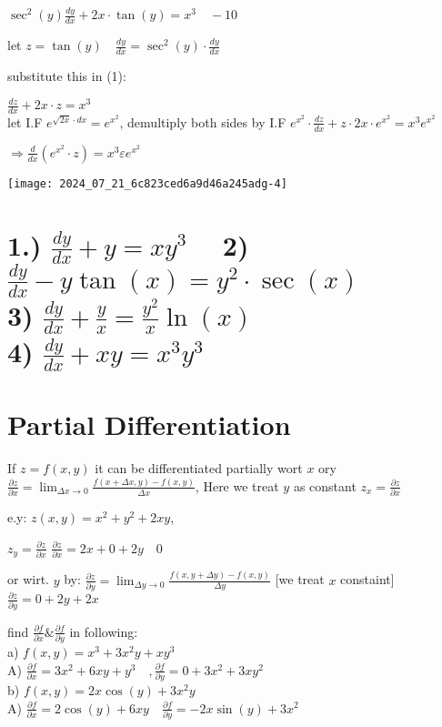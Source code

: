 \documentclass[12pt, a4paper]{article}
\begin{document}
$\sec ^{2}(y) \frac{d y}{d x}+2 x \cdot \tan (y)=x^{3} \quad-10$

let $z=\tan (y) \quad \frac{d y}{d x}=\sec ^{2}(y) \cdot \frac{d y}{d x}$

substitute this in (1):

$\frac{d z}{d x}+2 x \cdot z=x^{3}$\\
let I.F $e^{\sqrt{2 x} \cdot d x}=e^{x^{2}}$, demultiply both sides by I.F $e^{x^{2}} \cdot \frac{d z}{d x}+z \cdot 2 x \cdot e^{x^{2}}=x^{3} e^{x^{2}}$

$\Rightarrow \frac{d}{d x}\left(e^{x^{2}} \cdot z\right)=x^{3} \varepsilon e^{x^{2}}$

\begin{center}
\texttt{[image: 2024\_07\_21\_6c823ced6a9d46a245adg-4]}
\end{center}

\section*{1.) $\frac{d y}{d x}+y=x y^{3} \quad$ 2) $\frac{d y}{d x}-y \tan (x)=y^{2} \cdot \sec (x)$ \\
 3) $\frac{d y}{d x}+\frac{y}{x}=\frac{y^{2}}{x} \ln (x)$ \\
 4) $\frac{d y}{d x}+x y=x^{3} y^{3}$}
\section*{Partial Differentiation}
If $z=f(x, y)$ it can be differentiated partially wort $x$ ory $\frac{\partial z}{\partial x}=\lim _{\Delta x \rightarrow 0} \frac{f(x+\Delta x, y)-f(x, y)}{\Delta x}$, Here we treat $y$ as constant $z_{x}=\frac{\partial z}{\partial x}$

e.y: $z(x, y)=x^{2}+y^{2}+2 x y$,

$z_{y}=\frac{\partial z}{\partial x}$ $\frac{\partial z}{\partial x}=2 x+0+2 y \quad 0$

or wirt. $y$ by: $\frac{\partial z}{\partial y}=\lim _{\Delta y \rightarrow 0} \frac{f(x, y+\Delta y)-f(x, y)}{\Delta y}$ [we treat $x$ constaint] $\frac{\partial z}{\partial y}=0+2 y+2 x$

find $\frac{\partial f}{\partial x} \& \frac{\partial f}{\partial y}$ in following:\\
a) $f(x, y)=x^{3}+3 x^{2} y+x y^{3}$\\
A) $\frac{\partial f}{\partial x}=3 x^{2}+6 x y+y^{3} \quad, \frac{\partial f}{\partial y}=0+3 x^{2}+3 x y^{2}$\\
b) $f(x, y)=2 x \cos (y)+3 x^{2} y$\\
A) $\frac{\partial f}{\partial x}=2 \cos (y)+6 x y \quad \frac{\partial f}{\partial y}=-2 x \sin (y)+3 x^{2}$
\end{document}
